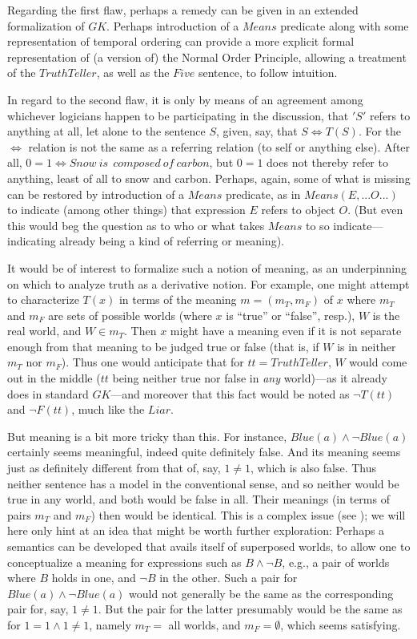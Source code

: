 \documentclass{amsart}
\begin{document}
Regarding the first flaw, perhaps a remedy can be given in an
extended formalization of $GK$. Perhaps introduction of a $Means$
predicate along with some representation of temporal ordering can
provide a more explicit formal representation of (a version of) the
Normal Order Principle, allowing a treatment of the $TruthTeller$, as
well as the $Five$ sentence, to follow intuition.

In regard to the second flaw, it is only by means of an agreement
among whichever 
logicians happen to be participating in the discussion, that $'S'$
refers to anything at all, let alone to the sentence $S$, given, say, that
$S \iff T(S)$. For the $\iff$ relation
is not the same as a referring relation (to self or anything else).
After all, $0=1 \iff Snow~is~~composed~of~carbon$, but $0=1$ does not thereby
refer to anything, least of all to snow and carbon. Perhaps, again, some of
what is missing can be restored by introduction of a $Means$
predicate, as in $Means(E,...O...)$ to indicate (among other things)
that expression $E$ refers 
to object $O$. (But even this would beg the question as to who or what
takes $Means$ to so indicate---indicating already being a kind of
referring or meaning).
 
It would be of interest to formalize such a notion of meaning, as an
underpinning on which to analyze truth as a derivative notion.  For
example, one might attempt to characterize $T(x)$ in terms of
the meaning $m = (m_T,m_F)$ of $x$ where $m_T$ and $m_F$ are sets of
possible worlds (where $x$ is ``true'' or ``false'', resp.), $W$ is
the real world, and $W \in m_T$. Then $x$ 
might have a meaning even if it is not separate enough from that meaning to
be judged true or false (that is, if $W$ is in neither $m_T$ nor $m_F$).
Thus one would anticipate that for $tt=TruthTeller$, $W$ would
come out in the middle ($tt$ being neither true nor false in {\em any}
world)---as it already does in standard $GK$---and moreover that this
fact would be noted as $\neg T(tt)$ and $\neg F(tt)$, much like the $Liar$.
 
But meaning is a bit more tricky than this. For instance, $Blue(a)
\wedge \neg Blue(a)$ certainly seems meaningful, indeed quite definitely
false.  And its meaning seems just as definitely different
from that of, say, ${1 \not =1}$, which is also false.  Thus neither
sentence has a model in the conventional sense, and so neither would
be true in any world, and both would be false in all.  Their
meanings (in terms of pairs $m_T$ and $m_F$) then would be identical. This
is a complex issue (see \cite{frege:sense,meinong:possibility}); we will here only hint at an
idea that might be worth further exploration: Perhaps a semantics can
be developed that avails itself of superposed worlds, to allow one to
conceptualize a meaning for expressions such as $B \wedge \neg B$, e.g., a pair
of worlds where $B$ holds in one, and $\neg B$ in the other. Such a pair
for $Blue(a) \wedge \neg Blue(a)$ would not generally be the same as the
corresponding pair for, say, $ 1\not =1$. But the pair for the
latter presumably would be the same as for $1=1 \wedge 1 \not =1$,
namely $m_T=$ all worlds, and $m_F=\emptyset$, which seems
satisfying. 
\end{document}
